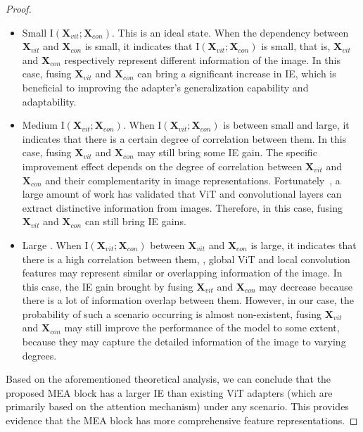 \begin{proof}
\begin{itemize}
\item {{Small} $\textrm{I}(\textbf{X}_{vit}; \textbf{X}_{con})$.} This is an ideal state. When the dependency between $\textbf{X}_{vit}$ and $\textbf{X}_{con}$ is small, it indicates that $\textrm{I}(\textbf{X}_{vit}; \textbf{X}_{con})$ is small, that is, $\textbf{X}_{vit}$ and $\textbf{X}_{con}$ respectively represent different information of the image. In this case, fusing $\textbf{X}_{vit}$ and $\textbf{X}_{con}$ can bring a significant increase in IE, which is beneficial to improving the adapter's generalization capability and adaptability.
\item {{Medium} $\textrm{I}(\textbf{X}_{vit}; \textbf{X}_{con})$.} When $\textrm{I}(\textbf{X}_{vit}; \textbf{X}_{con})$ is between small and large, it indicates that there is a certain degree of correlation between them. In this case, fusing $\textbf{X}_{vit}$ and $\textbf{X}_{con}$ may still bring some IE gain. The specific improvement effect depends on the degree of correlation between $\textbf{X}_{vit}$ and $\textbf{X}_{con}$ and their complementarity in image representations. Fortunately~\citep{zhang2022graph,zhang2023cae,marouf2024mini,liu2023efficientvit}, a large amount of work has validated that ViT and convolutional layers can extract distinctive information from images. Therefore, in this case, fusing $\textbf{X}_{vit}$ and $\textbf{X}_{con}$ can still bring IE gains.
\item {{Large} .} When $\textrm{I}(\textbf{X}_{vit}; \textbf{X}_{con})$ between $\textbf{X}_{vit}$ and $\textbf{X}_{con}$ is large, it indicates that there is a high correlation between them, \ie, global ViT and local convolution features may represent similar or overlapping information of the image. In this case, the IE gain brought by fusing $\textbf{X}_{vit}$ and $\textbf{X}_{con}$ may decrease because there is a lot of information overlap between them. However, in our case, the probability of such a scenario occurring is almost non-existent, fusing $\textbf{X}_{vit}$ and $\textbf{X}_{con}$ may still improve the performance of the model to some extent, because they may capture the detailed information of the image to varying degrees.
\end{itemize}

Based on the aforementioned theoretical analysis, we can conclude that the proposed MEA block has a larger IE than existing ViT adapters (which are primarily based on the attention mechanism) under any scenario. This provides evidence that the MEA block has more comprehensive feature representations. 
\end{proof}
